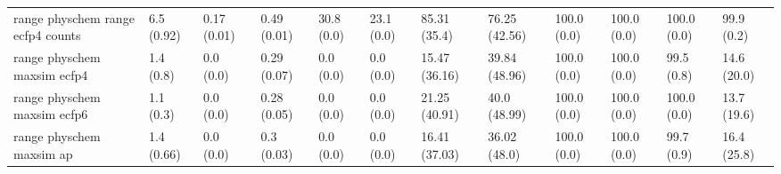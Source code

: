 \begin{tabular}{llllllllllll}
range physchem range ecfp4 counts & {\cellcolor[HTML]{F3FAFC}} \color[HTML]{000000} 6.5 (0.92) & {\cellcolor[HTML]{F7FCFD}} \color[HTML]{000000} 0.17 (0.01) & {\cellcolor[HTML]{6AC4A7}} \color[HTML]{000000} 0.49 (0.01) & {\cellcolor[HTML]{B5E3D9}} \color[HTML]{000000} 30.8 (0.0) & {\cellcolor[HTML]{D0EDE9}} \color[HTML]{000000} 23.1 (0.0) & {\cellcolor[HTML]{067230}} \color[HTML]{F1F1F1} 85.31 (35.4) & {\cellcolor[HTML]{1F8742}} \color[HTML]{F1F1F1} 76.25 (42.56) & {\cellcolor[HTML]{00441B}} \color[HTML]{F1F1F1} 100.0 (0.0) & {\cellcolor[HTML]{00441B}} \color[HTML]{F1F1F1} 100.0 (0.0) & {\cellcolor[HTML]{00441B}} \color[HTML]{F1F1F1} 100.0 (0.0) & {\cellcolor[HTML]{00441B}} \color[HTML]{F1F1F1} 99.9 (0.2) \\
range physchem maxsim ecfp4 & {\cellcolor[HTML]{F6FCFD}} \color[HTML]{000000} 1.4 (0.8) & {\cellcolor[HTML]{F7FCFD}} \color[HTML]{000000} 0.0 (0.0) & {\cellcolor[HTML]{BCE6DD}} \color[HTML]{000000} 0.29 (0.07) & {\cellcolor[HTML]{F7FCFD}} \color[HTML]{000000} 0.0 (0.0) & {\cellcolor[HTML]{F7FCFD}} \color[HTML]{000000} 0.0 (0.0) & {\cellcolor[HTML]{DFF3F5}} \color[HTML]{000000} 15.47 (36.16) & {\cellcolor[HTML]{8FD4C2}} \color[HTML]{000000} 39.84 (48.96) & {\cellcolor[HTML]{00441B}} \color[HTML]{F1F1F1} 100.0 (0.0) & {\cellcolor[HTML]{00441B}} \color[HTML]{F1F1F1} 100.0 (0.0) & {\cellcolor[HTML]{00451C}} \color[HTML]{F1F1F1} 99.5 (0.8) & {\cellcolor[HTML]{E1F4F6}} \color[HTML]{000000} 14.6 (20.0) \\
range physchem maxsim ecfp6 & {\cellcolor[HTML]{F6FCFD}} \color[HTML]{000000} 1.1 (0.3) & {\cellcolor[HTML]{F7FCFD}} \color[HTML]{000000} 0.0 (0.0) & {\cellcolor[HTML]{BFE7DE}} \color[HTML]{000000} 0.28 (0.05) & {\cellcolor[HTML]{F7FCFD}} \color[HTML]{000000} 0.0 (0.0) & {\cellcolor[HTML]{F7FCFD}} \color[HTML]{000000} 0.0 (0.0) & {\cellcolor[HTML]{D4EFEC}} \color[HTML]{000000} 21.25 (40.91) & {\cellcolor[HTML]{8FD4C2}} \color[HTML]{000000} 40.0 (48.99) & {\cellcolor[HTML]{00441B}} \color[HTML]{F1F1F1} 100.0 (0.0) & {\cellcolor[HTML]{00441B}} \color[HTML]{F1F1F1} 100.0 (0.0) & {\cellcolor[HTML]{00441B}} \color[HTML]{F1F1F1} 100.0 (0.0) & {\cellcolor[HTML]{E3F4F7}} \color[HTML]{000000} 13.7 (19.6) \\
range physchem maxsim ap & {\cellcolor[HTML]{F4FBFC}} \color[HTML]{000000} 1.4 (0.66) & {\cellcolor[HTML]{F7FCFD}} \color[HTML]{000000} 0.0 (0.0) & {\cellcolor[HTML]{B7E4DA}} \color[HTML]{000000} 0.3 (0.03) & {\cellcolor[HTML]{F7FCFD}} \color[HTML]{000000} 0.0 (0.0) & {\cellcolor[HTML]{F7FCFD}} \color[HTML]{000000} 0.0 (0.0) & {\cellcolor[HTML]{DDF2F3}} \color[HTML]{000000} 16.41 (37.03) & {\cellcolor[HTML]{9FDACC}} \color[HTML]{000000} 36.02 (48.0) & {\cellcolor[HTML]{00441B}} \color[HTML]{F1F1F1} 100.0 (0.0) & {\cellcolor[HTML]{00441B}} \color[HTML]{F1F1F1} 100.0 (0.0) & {\cellcolor[HTML]{00441B}} \color[HTML]{F1F1F1} 99.7 (0.9) & {\cellcolor[HTML]{DDF2F3}} \color[HTML]{000000} 16.4 (25.8) \\

\end{tabular}
